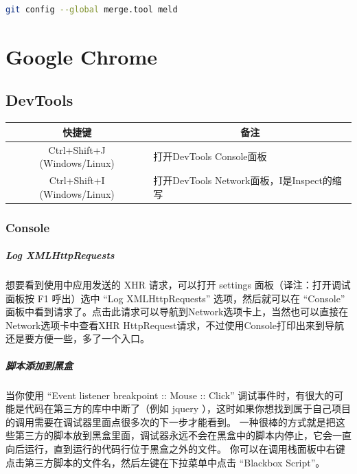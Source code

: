 \documentclass[letter]{book}
\begin{document}
\begin{lstlisting}[language=Bash]
git config --global merge.tool meld
\end{lstlisting}

\chapter{Google Chrome}

\section{DevTools}

\begin{tabular}{|c|p{6cm}|}
	\hline
	\multirow{1}{*}{快捷键}
	& \multicolumn{1}{c|}{备注}\\			
	\hline
	Ctrl+Shift+J (Windows/Linux)  & 打开DevTools Console面板 \\
	\hline
	Ctrl+Shift+I (Windows/Linux)  & 打开DevTools Network面板，I是Inspect的缩写 \\
	\hline
\end{tabular}

\subsection{Console}

\paragraph{Log XMLHttpRequests}

想要看到使用中应用发送的 XHR 请求，可以打开 settings 面板（译注：打开调试面板按 F1 呼出）选中 “Log XMLHttpRequests” 选项，然后就可以在 “Console” 面板中看到请求了。点击此请求可以导航到Network选项卡上，当然也可以直接在Network选项卡中查看XHR HttpRequest请求，不过使用Console打印出来到导航还是要方便一些，多了一个入口。

\paragraph{脚本添加到黑盒}

当你使用 “Event listener breakpoint :: Mouse :: Click” 调试事件时，有很大的可能是代码在第三方的库中中断了（例如 jquery ），这时如果你想找到属于自己项目的调用需要在调试器里面点很多次的下一步才能看到。 一种很棒的方式就是把这些第三方的脚本放到黑盒里面，调试器永远不会在黑盒中的脚本内停止，它会一直向后运行，直到运行的代码行位于黑盒之外的文件。 你可以在调用栈面板中右键点击第三方脚本的文件名，然后左键在下拉菜单中点击 “Blackbox Script”。
\end{document}
